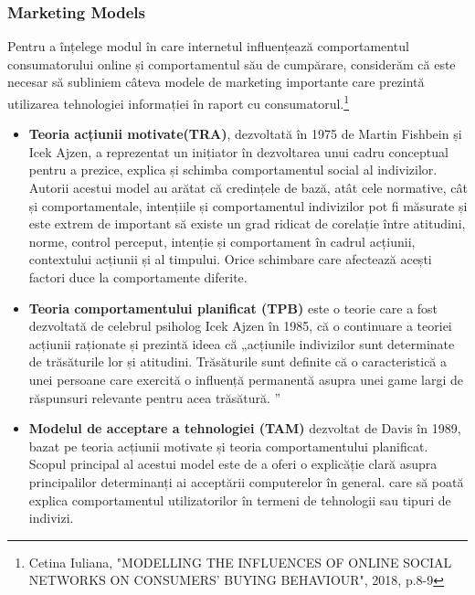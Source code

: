 \documentclass[a4paper, 12pt]{article}
\begin{document}
			\subsubsection{Marketing Models}		
			\quad Pentru a înțelege modul în care internetul influențează comportamentul consumatorului online și comportamentul său de cumpărare, considerăm că este necesar să subliniem câteva modele de marketing importante care prezintă utilizarea tehnologiei informației în raport cu consumatorul.\footnote{Cetina Iuliana, "MODELLING THE INFLUENCES OF ONLINE SOCIAL NETWORKS ON CONSUMERS’ BUYING BEHAVIOUR", 2018, p.8-9}
			\begin{itemize}
				\item \textbf{Teoria acțiunii motivate(TRA)}, dezvoltată în 1975 de Martin Fishbein și Icek Ajzen, a reprezentat un inițiator în dezvoltarea unui cadru conceptual pentru a prezice, explica și schimba comportamentul social al indivizilor. Autorii acestui model au arătat că credințele de bază, atât cele normative, cât și comportamentale, intențiile și comportamentul indivizilor pot fi măsurate și este extrem de important să existe un grad ridicat de corelație între atitudini, norme, control perceput, intenție și comportament în cadrul acțiunii, contextului acțiunii și al timpului. Orice schimbare care afectează acești factori duce la comportamente diferite.
				\item \textbf{Teoria comportamentului planificat (TPB)} este o teorie care a fost dezvoltată de celebrul psiholog Icek Ajzen în 1985, că o continuare a teoriei acțiunii raționate și prezintă ideea că „acțiunile indivizilor sunt determinate de trăsăturile lor și atitudini. Trăsăturile sunt definite că o caracteristică a unei persoane care exercită o influență permanentă asupra unei game largi de răspunsuri relevante pentru acea trăsătură. ”
				\item \textbf{Modelul de acceptare a tehnologiei (TAM)} dezvoltat de Davis în 1989, bazat pe teoria acțiunii motivate și teoria comportamentului planificat. Scopul principal al acestui model este de a oferi o explicăție clară asupra principalilor determinanți ai acceptării computerelor în general. care să poată explica comportamentul utilizatorilor în termeni de tehnologii sau tipuri de indivizi.
			\end{itemize}
			
\end{document}
